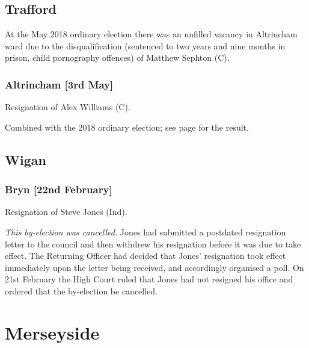 \documentclass[a4paper,openany]{book}
\begin{document}
\begin{resultsiii}
\subsection*{Trafford}

At the May 2018 ordinary election there was an unfilled vacancy in Altrincham ward due to the disqualification (sentenced to two years and nine months in prison, child pornography offences) of Matthew Sephton (C).

\subsubsection*{Altrincham \hspace*{\fill}\nolinebreak[1]%
\enspace\hspace*{\fill}
[3rd May]}


Resignation of Alex Williams (C).

Combined with the 2018 ordinary election; see page \pageref{AltrinchamTrafford} for the result.

\subsection*{Wigan}

\subsubsection*{Bryn \hspace*{\fill}\nolinebreak[1]%
\enspace\hspace*{\fill}
[22nd February]}


Resignation of Steve Jones (Ind).

\emph{This by-election was cancelled.}  Jones had submitted a postdated resignation letter to the council and then withdrew his resignation before it was due to take effect.  The Returning Officer had decided that Jones' resignation took effect immediately upon the letter being received, and accordingly organised a poll.  On 21st February the High Court ruled that Jones had not resigned his office and ordered that the by-election be cancelled.

\section{Merseyside}


\end{resultsiii}
\end{document}
